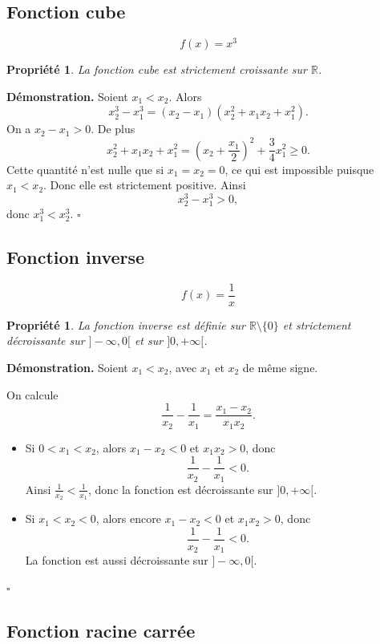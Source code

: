 \documentclass[11pt,a4paper]{article}
\newtheorem{propriete}[definition]{Propriété}
\newcommand{\R}{\mathbb{R}}
\begin{document}
\subsection{Fonction cube}

\[
f(x)=x^3
\]

\begin{propriete}
La fonction cube est strictement croissante sur \(\R\).
\end{propriete}

\textbf{Démonstration.}  
Soient \(x_1<x_2\). Alors
\[
x_2^3-x_1^3=(x_2-x_1)(x_2^2+x_1x_2+x_1^2).
\]
On a \(x_2-x_1>0\). De plus
\[
x_2^2+x_1x_2+x_1^2=\left(x_2+\frac{x_1}{2}\right)^2+\frac{3}{4}x_1^2\ge 0.
\]
Cette quantité n'est nulle que si \(x_1=x_2=0\), ce qui est impossible puisque \(x_1<x_2\). Donc elle est strictement positive. Ainsi
\[
x_2^3-x_1^3>0,
\]
donc \(x_1^3<x_2^3\). \(\square\)

\subsection{Fonction inverse}

\[
f(x)=\frac{1}{x}
\]

\begin{propriete}
La fonction inverse est définie sur \(\R\setminus\{0\}\) et strictement décroissante sur \(]-\infty,0[\) et sur \(]0,+\infty[\).
\end{propriete}

\textbf{Démonstration.}  
Soient \(x_1<x_2\), avec \(x_1\) et \(x_2\) de même signe.

On calcule
\[
\frac{1}{x_2}-\frac{1}{x_1}=\frac{x_1-x_2}{x_1x_2}.
\]

\begin{itemize}
    \item Si \(0<x_1<x_2\), alors \(x_1-x_2<0\) et \(x_1x_2>0\), donc
    \[
    \frac{1}{x_2}-\frac{1}{x_1}<0.
    \]
    Ainsi \(\frac1{x_2}<\frac1{x_1}\), donc la fonction est décroissante sur \(]0,+\infty[\).

    \item Si \(x_1<x_2<0\), alors encore \(x_1-x_2<0\) et \(x_1x_2>0\), donc
    \[
    \frac{1}{x_2}-\frac{1}{x_1}<0.
    \]
    La fonction est aussi décroissante sur \(]-\infty,0[\).
\end{itemize}
\(\square\)

\subsection{Fonction racine carrée}
\end{document}

